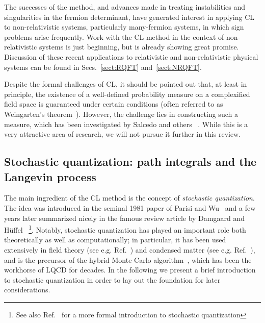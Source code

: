 \documentclass[../main.tex]{subfiles}
\begin{document}
The successes of the method, and advances made in treating instabilities and singularities in the fermion determinant, have generated interest in applying CL to non-relativistic systems, particularly many-fermion systems, in which sign problems arise frequently. Work with the CL method in the context of non-relativistic systems is just beginning, but is already showing great promise. Discussion of these recent applications to relativistic and non-relativistic physical systems can be found in Secs.~\ref{sect:RQFT} and~\ref{sect:NRQFT}.

Despite the formal challenges of CL, it should be pointed out that, at least in principle, the existence of a well-defined probability measure on a complexified field space
is guaranteed under certain conditions (often referred to as Weingarten's theorem~\cite{PhysRevLett.89.240201}). However, the challenge lies in constructing such a measure, which has been investigated by Salcedo and others ~\cite{Salcedo:1996sa, Salcedo_2007, Wosiek:2015iwl, Wosiek:2015bqg, PhysRevD.94.074503, Seiler_2017, Salcedo_2018, Wosiek:2018jht}. While this is a very attractive area of research, we will not pursue it further in this review.


\subsection{Stochastic quantization: path integrals and the Langevin process}
%
The main ingredient of the CL method is the concept of {\it stochastic quantization}. The idea was introduced in the seminal 1981 paper of Parisi and Wu~\cite{ParisiWu} and a few years later summarized nicely in the famous review article by Damgaard and H\"{u}ffel~\cite{PhysicsReportsStochasticQuantization} \footnote{See also Ref.~\cite{jona-lasinio1985} for a more formal introduction to stochastic quantization}.
Notably, stochastic quantization has played an important role both theoretically as well as computationally; in particular, it has been used extensively in field theory (see e.g. Ref.~\cite{PhysRevD.32.2736}) and condensed matter
(see e.g. Ref.~\cite{PhysRevB.99.035114}), and is the precursor of the
hybrid Monte Carlo algorithm~\cite{Duane:1987de, PhysRevD.35.2531}, which has been the workhorse of LQCD for decades. In the following we present a brief introduction to
stochastic quantization in order to lay out the foundation for later considerations.
\end{document}
